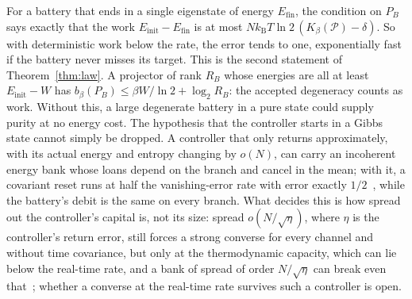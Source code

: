 \documentclass[11pt]{article}
\theoremstyle{definition}
\theoremstyle{remark}
\newcommand{\kB}{k_{\mathrm B}}
\newcommand{\Kb}{K_\beta}
\newcommand{\Pp}{\mathcal P}
\begin{document}
For a battery that ends in a single eigenstate of energy $E_{\mathrm{fin}}$, the condition on $P_B$ says exactly that the work $E_{\mathrm{init}}-E_{\mathrm{fin}}$ is at most $N\kB T\ln2\,(\Kb(\Pp)-\delta)$. So with deterministic work below the rate, the error tends to one, exponentially fast if the battery never misses its target. This is the second statement of Theorem~\ref{thm:law}. A projector of rank $R_B$ whose energies are all at least $E_{\mathrm{init}}-W$ has $b_\beta(P_B)\le\beta W/\ln2+\log_2R_B$: the accepted degeneracy counts as work. Without this, a large degenerate battery in a pure state could supply purity at no energy cost. The hypothesis that the controller starts in a Gibbs state cannot simply be dropped. A controller that only returns approximately, with its actual energy and entropy changing by $o(N)$, can carry an incoherent energy bank whose loans depend on the branch and cancel in the mean; with it, a covariant reset runs at half the vanishing-error rate with error exactly $1/2$~\cite{KeepingTime}, while the battery's debit is the same on every branch. What decides this is how spread out the controller's capital is, not its size: spread $o(N/\sqrt\eta)$, where $\eta$ is the controller's return error, still forces a strong converse for every channel and without time covariance, but only at the thermodynamic capacity, which can lie below the real-time rate, and a bank of spread of order $N/\sqrt\eta$ can break even that~\cite{KeepingTime}; whether a converse at the real-time rate survives such a controller is open.
\end{document}
